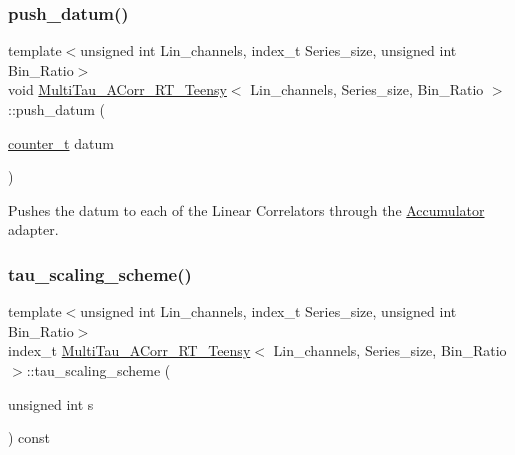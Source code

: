 \mbox{\label{classMultiTau__ACorr__RT__Teensy_a1ad6126310c987f53a0ec7ab3ae03a12}} 
\subsubsection{\texorpdfstring{push\+\_\+datum()}{push\_datum()}}
{\footnotesize\ttfamily template$<$unsigned int Lin\+\_\+channels, index\+\_\+t Series\+\_\+size, unsigned int Bin\+\_\+\+Ratio$>$ \\
void \hyperlink{classMultiTau__ACorr__RT__Teensy}{Multi\+Tau\+\_\+\+A\+Corr\+\_\+\+R\+T\+\_\+\+Teensy}$<$ Lin\+\_\+channels, Series\+\_\+size, Bin\+\_\+\+Ratio $>$\+::push\+\_\+datum (\begin{DoxyParamCaption}\item[{\hyperlink{types_8hpp_a22f279793847eba127de149437848c48}{counter\+\_\+t}}]{datum }\end{DoxyParamCaption})\hspace{0.3cm}{\ttfamily [inline]}}



Pushes the datum to each of the Linear Correlators through the \hyperlink{classAccumulator}{Accumulator} adapter. 

\mbox{\label{classMultiTau__ACorr__RT__Teensy_af90bc219b8b9dc316c56efd7c74aae6f}} 
\subsubsection{\texorpdfstring{tau\+\_\+scaling\+\_\+scheme()}{tau\_scaling\_scheme()}}
{\footnotesize\ttfamily template$<$unsigned int Lin\+\_\+channels, index\+\_\+t Series\+\_\+size, unsigned int Bin\+\_\+\+Ratio$>$ \\
index\+\_\+t \hyperlink{classMultiTau__ACorr__RT__Teensy}{Multi\+Tau\+\_\+\+A\+Corr\+\_\+\+R\+T\+\_\+\+Teensy}$<$ Lin\+\_\+channels, Series\+\_\+size, Bin\+\_\+\+Ratio $>$\+::tau\+\_\+scaling\+\_\+scheme (\begin{DoxyParamCaption}\item[{unsigned int}]{s }\end{DoxyParamCaption}) const\hspace{0.3cm}{\ttfamily [inline]}}



